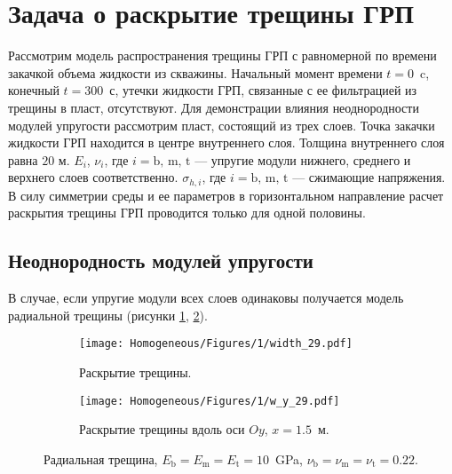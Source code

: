 \section{Задача о раскрытие трещины ГРП}
Рассмотрим модель распространения трещины ГРП с равномерной по времени закачкой объема жидкости из скважины. Начальный момент времени $t = 0$~c, конечный $t = 300$~с, утечки жидкости ГРП, связанные с ее фильтрацией из трещины в пласт, отсутствуют. Для демонстрации влияния неоднородности модулей упругости рассмотрим пласт, состоящий из трех слоев. Точка закачки жидкости ГРП находится в центре внутреннего слоя. Толщина внутреннего слоя равна $20$ м. $E_i$, $\nu_i$, где $i=\text{b, m, t}$ --- упругие модули нижнего, среднего и верхнего слоев соответственно. $\sigma_{h,i}$, где $i=\text{b, m, t}$ --- сжимающие напряжения. В силу симметрии среды и ее параметров в горизонтальном направление расчет раскрытия трещины ГРП проводится только для одной половины.

\subsection{Неоднородность модулей упругости}
В случае, если упругие модули всех слоев одинаковы получается модель радиальной трещины (рисунки \ref{fig:homogeneous-planar}, \ref{fig:homogeneous-slice}).
\begin{figure}[htbp]
    \centering
    \begin{subfigure}[t]{0.4\textwidth}
        \centering
        \texttt{[image: Homogeneous/Figures/1/width\_29.pdf]}
        \caption{Раскрытие трещины.}
        \label{fig:homogeneous-planar}
    \end{subfigure}
    \hfill 
    \begin{subfigure}[t]{0.55\textwidth}
        \centering
        \texttt{[image: Homogeneous/Figures/1/w\_y\_29.pdf]}
        \caption{Раскрытие трещины вдоль оси $Oy$, $x=1.5$~м.}
        \label{fig:homogeneous-slice}
    \end{subfigure}
    \caption{Радиальная трещина, $E_\text{b} = E_\text{m} = E_\text{t} = 10$~GPa, $\nu_\text{b} = \nu_\text{m} = \nu_\text{t} = 0.22$.}
    \label{fig:homogeneous}
\end{figure}

